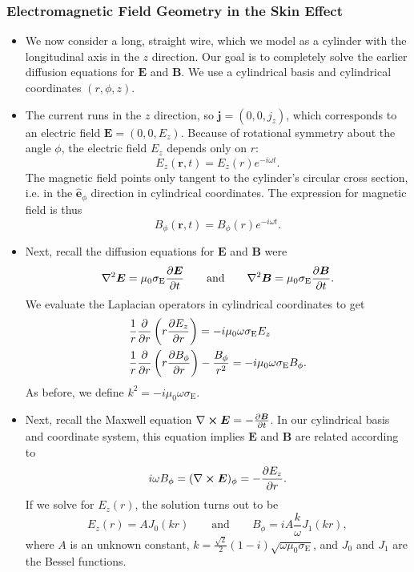 \documentclass[11pt, a4paper]{article}
\newcommand{\eqtext}[1]{\qquad \text{#1} \qquad}
\renewcommand{\vec}[1]{\bm{#1}} %
\newcommand{\uvec}[1]{\hat{\vec{#1}}} %
\renewcommand{\r}{\vec{r}}
\newcommand{\E}{\vec{E}} %
\newcommand{\B}{\vec{B}} %
\newcommand{\mm}{\mu_{0}}  %
\renewcommand{\j}{\vec{j}}  %
\renewcommand{\curl}{\nabla \cross}
\renewcommand{\laplacian}{\nabla^{2}}
\begin{document}
\subsubsection{Electromagnetic Field Geometry in the Skin Effect}
\begin{itemize}
	\item We now consider a long, straight wire, which we model as a cylinder with the longitudinal axis in the $ z $ direction. Our goal is to completely solve the earlier diffusion equations for $ \E $ and $ \B $. We use a cylindrical basis and cylindrical coordinates $ (r, \phi, z) $. 
	
	\item The current runs in the $ z $ direction, so $ \j = (0, 0, j_{z}) $, which corresponds to an electric field $ \E = (0, 0, E_{z}) $. Because of rotational symmetry about the angle $ \phi $, the electric field $ E_{z} $ depends only on $ r $:
	\begin{equation*}
		E_{z}(\r, t) = E_{z}(r)e^{-i\omega t}.
	\end{equation*}
	The magnetic field points only tangent to the cylinder's circular cross section, i.e. in the $ \uvec{e}_{\phi} $ direction in cylindrical coordinates. The expression for magnetic field is thus
	\begin{equation*}
		B_{\phi}(\r, t) = B_{\phi}(r)e^{-i\omega t}.
	\end{equation*}
	
    \item Next, recall the diffusion equations for $ \E $ and $ \B $ were
	\begin{equation*}
		\laplacian \E = \mm \sigma_{\text{E}}\pdv{\E}{t} \eqtext{and} \laplacian \B = \mm \sigma_{\text{E}} \pdv{\B}{t}.
	\end{equation*}
	We evaluate the Laplacian operators in cylindrical coordinates to get
	\begin{align*}
		& \frac{1}{r}\pdv{r}\left(r\pdv{E_{z}}{r}\right)  = -i \mm \omega \sigma_{\text{E}}E_{z} \\
		& \frac{1}{r}\pdv{r}\left(r\pdv{B_{\phi}}{r}\right) - \frac{B_{\phi}}{r^{2}} = -i \mm \omega \sigma_{\text{E}}B_{\phi}.
	\end{align*}
	As before, we define $ k^{2} = -i\mm \omega \sigma_{\text{E}} $. 

    \item Next, recall the Maxwell equation $ \curl \E = - \pdv{\B}{t} $. In our cylindrical basis and coordinate system, this equation implies $ \E $ and $ \B $ are related according to
	\begin{equation*}
		i \omega B_{\phi} = (\curl \E)_{\phi} = -\pdv{E_{z}}{r}.
	\end{equation*}
	If we solve for $ E_{z}(r) $, the solution turns out to be
	\begin{equation*}
		E_{z}(r) = A J_{0}(kr) \eqtext{and} B_{\phi} = i A \frac{k}{\omega} J_{1}(kr),
	\end{equation*}
	where $ A $ is an unknown constant, $ k = \frac{\sqrt{2}}{2}(1- i)\sqrt{\omega \mm \sigma_{\text{E}}} $,	and $ J_{0} $ and $ J_{1} $ are the Bessel functions.
	
\end{itemize}
\end{document}
